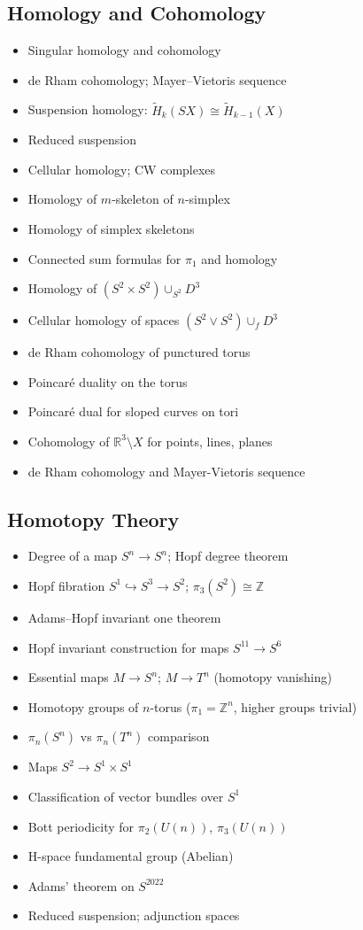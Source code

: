 \documentclass{amsart}
\begin{document}
\subsection{Homology and Cohomology}
\begin{itemize}
    \item Singular homology and cohomology
    \item de Rham cohomology; Mayer--Vietoris sequence
    \item Suspension homology: $\widetilde{H}_k(SX) \cong \widetilde{H}_{k-1}(X)$
    \item Reduced suspension
    \item Cellular homology; CW complexes
    \item Homology of $m$-skeleton of $n$-simplex
    \item Homology of simplex skeletons
    \item Connected sum formulas for $\pi_1$ and homology
    \item Homology of $(S^2 \times S^2) \cup_{S^2} D^3$
    \item Cellular homology of spaces $(S^2 \vee S^2) \cup_f D^3$
    \item de Rham cohomology of punctured torus
    \item Poincaré duality on the torus
    \item Poincaré dual for sloped curves on tori
    \item Cohomology of $\mathbb{R}^3 \setminus X$ for points, lines, planes
    \item de Rham cohomology and Mayer-Vietoris sequence
\end{itemize}

\subsection{Homotopy Theory}
\begin{itemize}
    \item Degree of a map $S^n \to S^n$; Hopf degree theorem
    \item Hopf fibration $S^1 \hookrightarrow S^3 \to S^2$; $\pi_3(S^2) \cong \mathbb{Z}$
    \item Adams--Hopf invariant one theorem
    \item Hopf invariant construction for maps $S^{11} \to S^6$
    \item Essential maps $M \to S^n$; $M \to T^n$ (homotopy vanishing)
    \item Homotopy groups of $n$-torus ($\pi_1 = \mathbb{Z}^n$, higher groups trivial)
    \item $\pi_n(S^n)$ vs $\pi_n(T^n)$ comparison
    \item Maps $S^2 \to S^1 \times S^1$
    \item Classification of vector bundles over $S^1$
    \item Bott periodicity for $\pi_2(U(n))$, $\pi_3(U(n))$
    \item H-space fundamental group (Abelian)
    \item Adams' theorem on $S^{2022}$
    \item Reduced suspension; adjunction spaces
\end{itemize}
\end{document}
